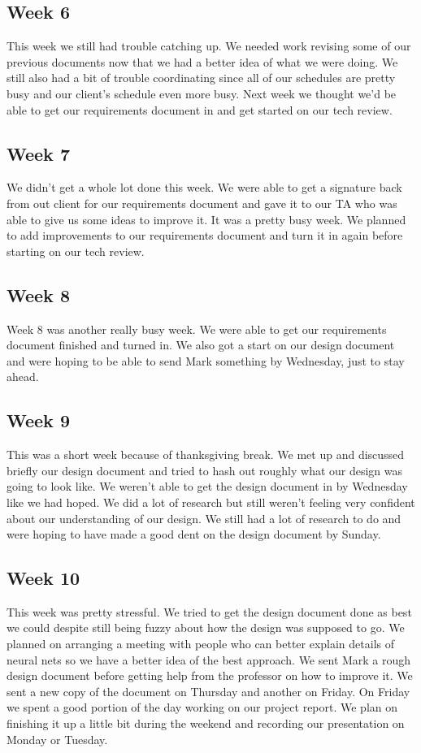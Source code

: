 \documentclass[onecolumn, draftclsnofoot,10pt, compsoc]{IEEEtran}
\begin{document}
\subsection{Week 6}
This week we still had trouble catching up.
We needed work revising some of our previous documents now that we had a better idea of what we were doing.
We still also had a bit of trouble coordinating since all of our schedules are pretty busy and our client's schedule even more busy.
Next week we thought we'd be able to get our requirements document in and get started on our tech review.

\subsection{Week 7}
We didn't get a whole lot done this week.
We were able to get a signature back from out client for our requirements document and gave it to our TA who was able to give us some ideas to improve it.
It was a pretty busy week.
We planned to add improvements to our requirements document and turn it in again before starting on our tech review.

\subsection{Week 8}
Week 8 was another really busy week.
We were able to get our requirements document finished and turned in.
We also got a start on our design document and were hoping to be able to send Mark something by Wednesday, just to stay ahead.

\subsection{Week 9}
This was a short week because of thanksgiving break.
We met up and discussed briefly our design document and tried to hash out roughly what our design was going to look like.
We weren't able to get the design document in by Wednesday like we had hoped.
We did a lot of research but still weren't feeling very confident about our understanding of our design.
We still had a lot of research to do and were hoping to have made a good dent on the design document by Sunday.

\subsection{Week 10}
This week was pretty stressful.
We tried to get the design document done as best we could despite still being fuzzy about how the design was supposed to go.
We planned on arranging a meeting with people who can better explain details of neural nets so we have a better idea of the best approach.
We sent Mark a rough design document before getting help from the professor on how to improve it.
We sent a new copy of the document on Thursday and another on Friday.
On Friday we spent a good portion of the day working on our project report.
We plan on finishing it up a little bit during the weekend and recording our presentation on Monday or Tuesday.
\end{document}
